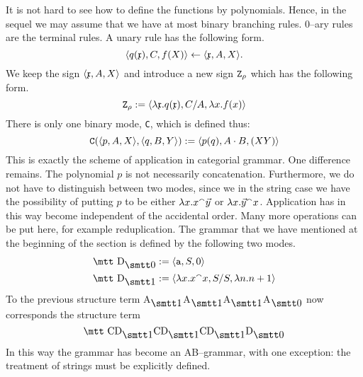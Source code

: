 It is not hard to see how to define the functions by polynomials.
Hence, in the sequel we may assume that we have at most binary
branching rules. 0--ary rules are the terminal rules.
A unary rule has the following form.
\begin{equation}
\langle q(\mathfrak{x}), C, f(X)\rangle \leftarrow \langle \mathfrak{x}, A, X\rangle.
\end{equation}
We keep the sign $\langle \mathfrak{x}, A, X\rangle$ and introduce a new
sign $\mbox{\tt Z}_{\rho}$ which has the following form.
\begin{equation}
\mbox{\tt Z}_{\rho} := \langle \lambda \mathfrak{x}.q(\mathfrak{x}), C/A,
\lambda x.f(x)\rangle
\end{equation}
There is only one binary mode, {\tt C}, which is defined thus:
\begin{equation}
\mbox{\tt C}(\langle p, A, X\rangle, \langle q, B, Y\rangle) :=
\langle p(q), A \cdot B, (XY)\rangle 
\end{equation}
This is exactly the scheme of application in categorial grammar.
One difference remains. The polynomial $p$ is not necessarily
concatenation. Furthermore, we do not have to distinguish
between two modes, since we in the string case we have the 
possibility of putting $p$ to be either $\lambda x.x {^{\smallfrown}} \vec{y}$ 
or $\lambda x.\vec{y} {^{\smallfrown}} x$.
Application has in this way become independent of the accidental
order. Many more operations can be put here, for example
reduplication. The grammar that
we have mentioned at the beginning of the section is defined
by the following two modes.
\begin{equation}
\begin{split}
\mbox{\mtt D}_{\snull} & := \auf \mbox{\tt a}, S, 0\zu \\
\mbox{\mtt D}_{\seins} & := \auf \lambda x.x \conc x, S/S, \lambda n.n+1\zu
\end{split}
\end{equation}
To the previous structure term
{\mtt A$_{\seins}$A$_{\seins}$A$_{\seins}$A$_{\snull}$} 
now corresponds the structure term
\begin{equation}
\mbox{\mtt CD$_{\seins}$CD$_{\seins}$CD$_{\seins}$D$_{\snull}$}
\end{equation}
In this way the grammar has become an AB--grammar, with
one exception: the treatment of strings must be explicitly defined.

